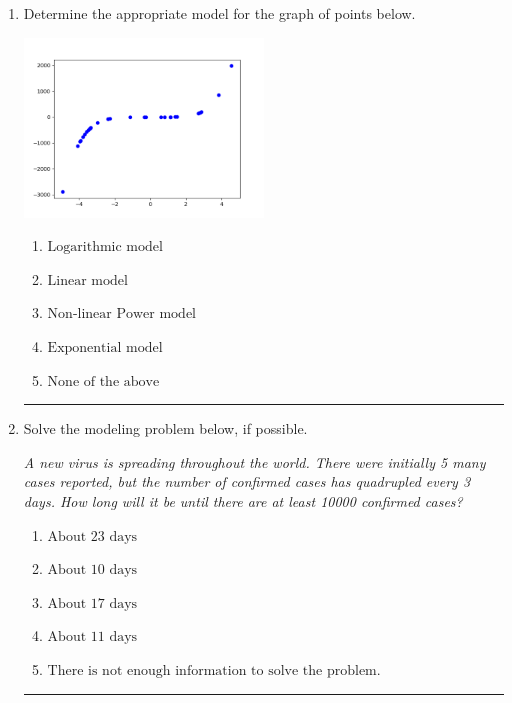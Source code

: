 \documentclass[14pt]{extbook}
\newcommand{\litem}[1]{\item#1\hspace*{-1cm}\rule{\textwidth}{0.4pt}}
\begin{document}
\begin{enumerate}
{\begin{enumerate}[label=\Alph*.]
\end{enumerate} }
\litem{
Determine the appropriate model for the graph of points below.
\begin{center}
    \includegraphics[width=0.5\textwidth]{../Figures/identifyModelGraph12B.png}
\end{center}
\begin{enumerate}[label=\Alph*.]
\item \( \text{Logarithmic model} \)
\item \( \text{Linear model} \)
\item \( \text{Non-linear Power model} \)
\item \( \text{Exponential model} \)
\item \( \text{None of the above} \)

\end{enumerate} }
\litem{
Solve the modeling problem below, if possible.
\begin{center}
    \textit{ A new virus is spreading throughout the world. There were initially 5 many cases reported, but the number of confirmed cases has quadrupled every 3 days. How long will it be until there are at least 10000 confirmed cases? }
\end{center}
\begin{enumerate}[label=\Alph*.]
\item \( \text{About } 23 \text{ days} \)
\item \( \text{About } 10 \text{ days} \)
\item \( \text{About } 17 \text{ days} \)
\item \( \text{About } 11 \text{ days} \)
\item \( \text{There is not enough information to solve the problem.} \)


\end{enumerate}}
\end{enumerate}
\end{document}
